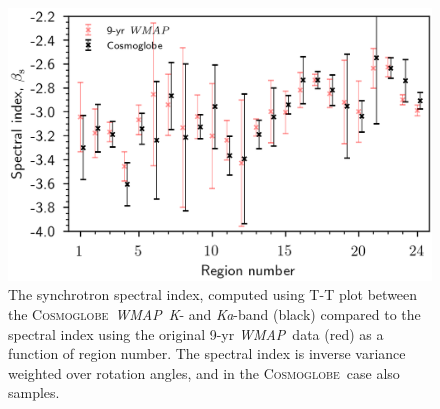 \documentclass[twocolumn]{../../common/aa}
\def\WMAP{\emph{WMAP}}
\newcommand{\Cosmoglobe}{\textsc{Cosmoglobe}}
\newcommand{\K}[0]{\textit K}
\newcommand{\Ka}[0]{\textit{Ka}}
\begin{document}
\begin{figure}
	\centering
	\includegraphics[width=\linewidth]{figures/region_beta_cosmoglobe_vs_wmap.png}
	\caption{The synchrotron spectral index, computed using T-T plot between the \Cosmoglobe\ \WMAP\ \K- and \Ka-band (black) compared to the spectral index using the original 9-yr \WMAP\ data (red) as a function of region number. The spectral index is inverse variance weighted over rotation angles, and in the \Cosmoglobe\ case also samples.}
        \label{fig:beta_region}
\end{figure}
\end{document}
